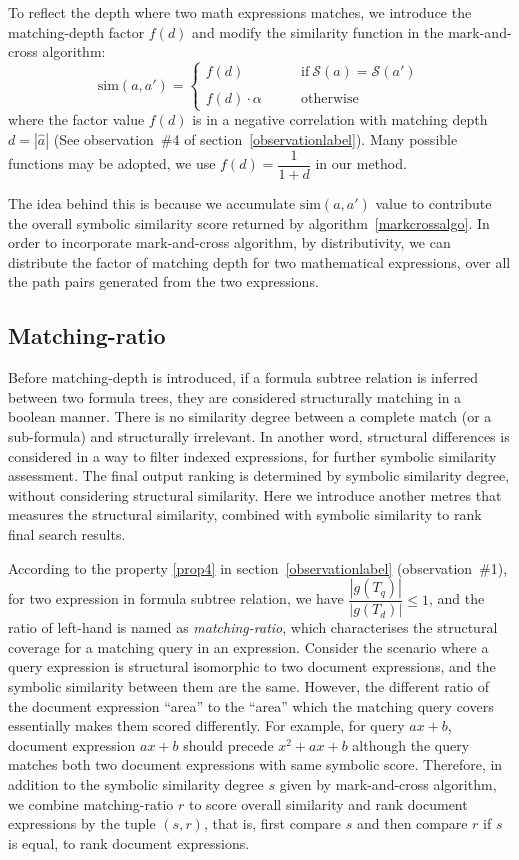 To reflect the depth where two math expressions matches, we introduce the matching-depth factor $f(d)$ and modify the similarity function in the mark-and-cross algorithm:
$$
\mathrm{sim}(a,a') = 
\left\{
\begin{array}{ll}
f(d)   &\qquad \mathrm{if}\  \mathcal{S}(a) = \mathcal{S}(a')
\\
\\
f(d) \cdot \alpha  &\qquad \mathrm{otherwise}
\end{array}
\right.
$$
where the factor value $f(d)$ is in a negative correlation with matching depth $d = |\hat{a}|$ (See observation~\#4 of section~\ref{observationlabel}). 
Many possible functions may be adopted, we use $f(d) = \dfrac{1}{1 + d}$ in our method. 

The idea behind this is because we accumulate $\mathrm{sim}(a,a')$ value to contribute the overall symbolic similarity score returned by algorithm~\ref{markcrossalgo}. In order to incorporate mark-and-cross algorithm, by distributivity, we can distribute the factor of matching depth for two mathematical expressions, over all the path pairs generated from the two expressions. 

\subsection{Matching-ratio}
Before matching-depth is introduced, if a formula subtree relation is inferred between two formula trees, they are considered structurally matching in a boolean manner. 
There is no similarity degree between a complete match (or a sub-formula) and structurally irrelevant. 
In another word, structural differences is considered in a way to filter indexed expressions, for further symbolic similarity assessment. 
The final output ranking is determined by symbolic similarity degree, without considering structural similarity. 
Here we introduce another metres that measures the structural similarity, combined with symbolic similarity to rank final search results.

According to the property \ref{prop4} in section~\ref{observationlabel} (observation~\#1), for two expression in formula subtree relation, we have $\dfrac{|g(T_q)|}{|g(T_d)|} \le 1$, and the ratio of left-hand is named as \textit{matching-ratio}, which characterises the structural coverage for a matching query in an expression.
Consider the scenario where a query expression is structural isomorphic to two document expressions, and the symbolic similarity between them are the same. 
However, the different ratio of the document expression ``area'' to the ``area'' which the matching query covers essentially makes them scored differently.
For example, for query $ax + b$, document expression $ax + b$ should precede $x^2 + ax + b$ although the query matches both two document expressions with same symbolic score.
Therefore, in addition to the symbolic similarity degree $s$ given by mark-and-cross algorithm, we combine matching-ratio $r$ to score overall similarity and rank document expressions by the tuple $(s, r)$, that is, first compare $s$ and then compare $r$ if $s$ is equal, to rank document expressions.


